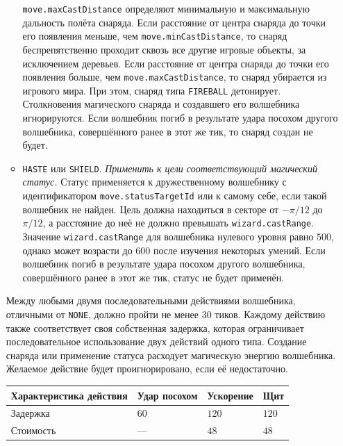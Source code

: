\begin{itemize}
\begin{itemize}
                    \texttt{move.maxCastDistance} определяют минимальную и максимальную дальность полёта снаряда. Если расстояние от центра
                    снаряда до точки его появления меньше, чем \texttt{move.minCastDistance}, то снаряд беспрепятственно проходит сквозь все
                    другие игровые объекты, за исключением деревьев. Если расстояние от центра снаряда до точки его появления больше, чем
                    \texttt{move.maxCastDistance}, то снаряд убирается из игрового мира. При этом, снаряд типа \texttt{FIREBALL} детонирует.
                    Столкновения магического снаряда и создавшего его волшебника игнорируются. Если волшебник погиб в результате удара
                    посохом другого волшебника, совершённого ранее в этот же тик, то снаряд создан не будет.
              \item \texttt{HASTE} или \texttt{SHIELD}. \textit{Применить к цели соответствующий магический статус.} Статус применяется к
                    дружественному волшебнику с идентификатором \texttt{move.statusTargetId} или к самому себе, если такой волшебник не
                    найден. Цель должна находиться в секторе от $-\pi / 12$ до $\pi / 12$, а расстояние до неё не должно превышать
                    \texttt{wizard.castRange}. Значение \texttt{wizard.castRange} для волшебника нулевого уровня равно $500$, однако может
                    возрасти до $600$ после изучения некоторых умений. Если волшебник погиб в результате удара посохом другого волшебника,
                    совершённого ранее в этот же тик, статус не будет применён.
          \end{itemize}

          Между любыми двумя последовательными действиями волшебника, отличными от \texttt{NONE}, должно пройти не менее $30$ тиков. Каждому
          действию также соответствует своя собственная задержка, которая ограничивает последовательное использование двух действий одного
          типа. Создание снаряда или применение статуса расходует магическую энергию волшебника. Желаемое действие будет проигнорировано,
          если её недостаточно.

          \begin{tabular}{| l | l | l | l |}
              \hline
              Характеристика действия & Удар посохом & Ускорение & Щит   \\
              \hline
              Задержка                & $60$         & $120$     & $120$ \\
              Стоимость               & ---          & $48$      & $48$  \\
              \hline
          \end{tabular}


\end{itemize}
